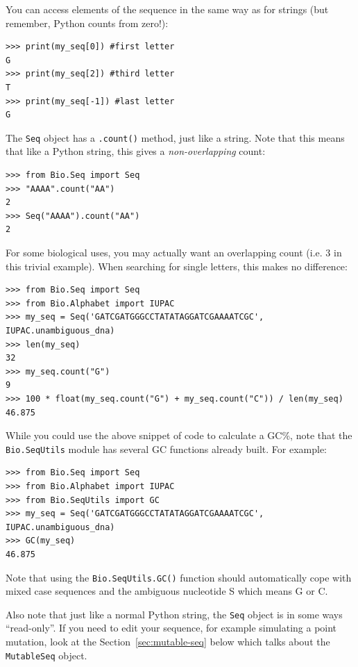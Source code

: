 \documentclass{report}
\begin{document}
You can access elements of the sequence in the same way as for strings (but remember, Python counts from zero!):

\begin{verbatim}
>>> print(my_seq[0]) #first letter
G
>>> print(my_seq[2]) #third letter
T
>>> print(my_seq[-1]) #last letter
G
\end{verbatim}

The \verb|Seq| object has a \verb|.count()| method, just like a string.
Note that this means that like a Python string, this gives a
\emph{non-overlapping} count:

\begin{verbatim}
>>> from Bio.Seq import Seq
>>> "AAAA".count("AA")
2
>>> Seq("AAAA").count("AA")
2
\end{verbatim}

\noindent For some biological uses, you may actually want an overlapping count
(i.e. $3$ in this trivial example). When searching for single letters, this
makes no difference:

\begin{verbatim}
>>> from Bio.Seq import Seq
>>> from Bio.Alphabet import IUPAC
>>> my_seq = Seq('GATCGATGGGCCTATATAGGATCGAAAATCGC', IUPAC.unambiguous_dna)
>>> len(my_seq)
32
>>> my_seq.count("G")
9
>>> 100 * float(my_seq.count("G") + my_seq.count("C")) / len(my_seq)
46.875
\end{verbatim}

While you could use the above snippet of code to calculate a GC\%, note that  the \verb|Bio.SeqUtils| module has several GC functions already built.  For example:

\begin{verbatim}
>>> from Bio.Seq import Seq
>>> from Bio.Alphabet import IUPAC
>>> from Bio.SeqUtils import GC
>>> my_seq = Seq('GATCGATGGGCCTATATAGGATCGAAAATCGC', IUPAC.unambiguous_dna)
>>> GC(my_seq)
46.875
\end{verbatim}

\noindent Note that using the \verb|Bio.SeqUtils.GC()| function should automatically cope with mixed case sequences and the ambiguous nucleotide S which means G or C.

Also note that just like a normal Python string, the \verb|Seq| object is in some ways ``read-only''.  If you need to edit your sequence, for example simulating a point mutation, look at the Section~\ref{sec:mutable-seq} below which talks about the \verb|MutableSeq| object.
\end{document}

